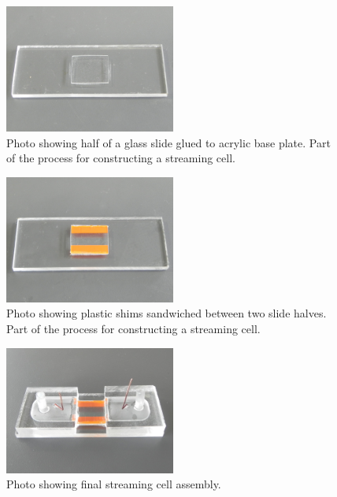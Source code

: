     \begin{figure}[p]
      \centering
      \includegraphics[width=0.5\textwidth]{content/pt1/01-PowerHarvesting/graphics/Photo_streamingPotential_Assembly_Step1.JPG}
      \caption{\label{fig:Photo_streamingPotential_Assembly_Step1}Photo showing half of a glass slide glued to acrylic base plate. Part of the process for constructing a streaming cell.}
    \end{figure}
    \begin{figure}[p]
      \centering
      \includegraphics[width=0.5\textwidth]{content/pt1/01-PowerHarvesting/graphics/Photo_streamingPotential_Assembly_Step2.JPG}
      \caption{\label{fig:Photo_streamingPotential_Assembly_Step2}Photo showing plastic shims sandwiched between two slide halves. Part of the process for constructing a streaming cell.}
    \end{figure}
    \begin{figure}[p]
      \centering
      \includegraphics[width=0.5\textwidth]{content/pt1/01-PowerHarvesting/graphics/Photo_streamingPotential_Assembly_Step3.JPG}
      \caption{\label{fig:Photo_streamingPotential_Assembly_Step3}Photo showing final streaming cell assembly.}
    \end{figure}


